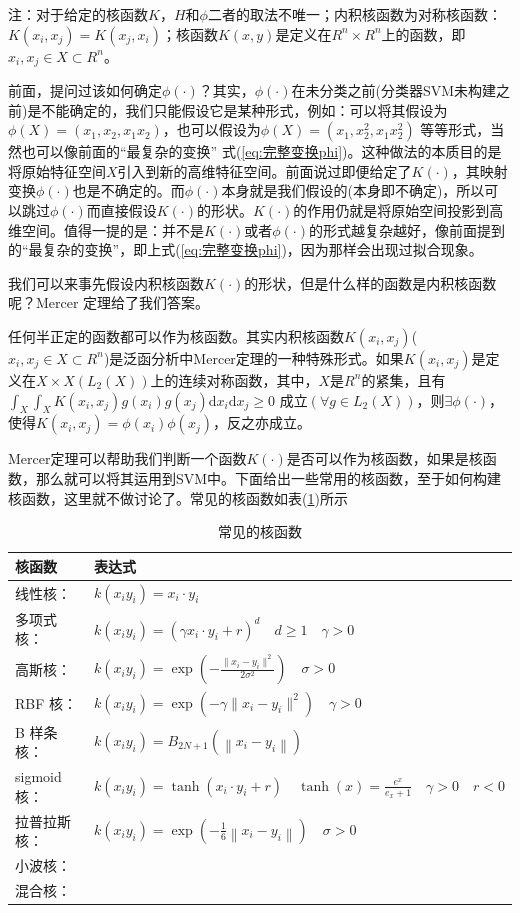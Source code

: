 	注：对于给定的核函数$K$，$H$和$\phi$二者的取法不唯一；内积核函数为对称核函数：$K(x_i,x_j)=K(x_j,x_i)$；核函数$K(x,y)$是定义在$R^n\times R^n$上的函数，即$x_i,x_j\in X\subset R^n$。
	\par
	前面，提问过该如何确定$\phi(\cdot)$？其实，$\phi(\cdot)$在未分类之前(分类器SVM未构建之前)是不能确定的，我们只能假设它是某种形式，例如：可以将其假设为$\phi(X)=(x_1,x_2,x_1x_2)$，也可以假设为$\phi(X)=(x_1,x_2^2,x_1x_2^2)$ 等等形式，当然也可以像前面的“最复杂的变换”
	式(\ref{eq:完整变换phi})。这种做法的本质目的是将原始特征空间$X$引入到新的高维特征空间。前面说过即便给定了$K(\cdot)$，其映射变换$\phi(\cdot)$也是不确定的。而$\phi(\cdot)$本身就是我们假设的(本身即不确定)，所以可以跳过$\phi(\cdot)$而直接假设$K(\cdot)$的形状。$K(\cdot)$的作用仍就是将原始空间投影到高维空间。值得一提的是：并不是$K(\cdot)$或者$\phi(\cdot)$的形式越复杂越好，像前面提到的“最复杂的变换”，即上式(\ref{eq:完整变换phi})，因为那样会出现过拟合现象。
	\par
	我们可以来事先假设内积核函数$K(\cdot)$的形状，但是什么样的函数是内积核函数呢？Mercer 定理给了我们答案。
	\begin{theorem}[Mercer定理]
	任何半正定的函数都可以作为核函数。其实内积核函数$K(x_i,x_j)$($x_i,x_j\in X\subset R^n$)是泛函分析中Mercer定理的一种特殊形式。如果$K(x_i,x_j)$是定义在$X\times X$$\left(L_2(X)\right)$上的连续对称函数，其中，$X$是$R^n$的紧集，且有$\int_X\int_X K(x_i,x_j)g(x_i)g(x_j)\mathrm{d}x_i\mathrm{d}x_j \geqslant 0$ 成立$\left(\forall g\in L_2(X)\right)$，则$\exists\phi(\cdot)$，使得$K(x_i,x_j)=\phi(x_i)\phi(x_j)$，反之亦成立。
	\end{theorem}
	\par
	Mercer定理可以帮助我们判断一个函数$K(\cdot)$是否可以作为核函数，如果是核函数，那么就可以将其运用到SVM中。下面给出一些常用的核函数，至于如何构建核函数，这里就不做讨论了。常见的核函数如表(\ref{tab:支持向量机-基本支持向量机-常见的核函数})所示
	\begin{table}[H]
		\caption{常见的核函数}
		\label{tab:支持向量机-基本支持向量机-常见的核函数}
		\centering
		\begin{tabular}{ll}
		\toprule
		核函数 & 表达式 \\
		\midrule
		线性核：& $ k(x_i y_i) = x_i \cdot y_i $ \\
		多项式核：& $ k(x_i y_i) = (\gamma x_i \cdot y_i + r)^d \quad d \geqslant 1 \quad \gamma > 0 $ \\
		高斯核：& $ k(x_i y_i) = \exp (-\frac{\| x_i - y_i \|^2}{2 \sigma^2}) \quad \sigma > 0 $ \\
		RBF 核：& $ k(x_i y_i) = \exp (-\gamma \| x_i - y_i \|^2) \quad \gamma > 0 $ \\
		B 样条核：& $ k(x_i y_i) = B_{2N+1} \left( \left\| x_i - y_i \right\| \right) $ \\
		sigmoid 核：& $ k(x_i y_i) = \tanh(x_i \cdot y_i + r) \quad \tanh(x) = \frac{ e^x }{ e_x + 1 } \quad \gamma > 0 \quad r<0 $ \\
		拉普拉斯核：& $ k(x_i y_i) = \exp(-\frac{ 1 }{ 6 } \left\| x_i - y_i \right\| ) \quad \sigma > 0 $ \\
		小波核：& \\
		混合核：& \\
		\bottomrule
		\end{tabular}
	\end{table}
